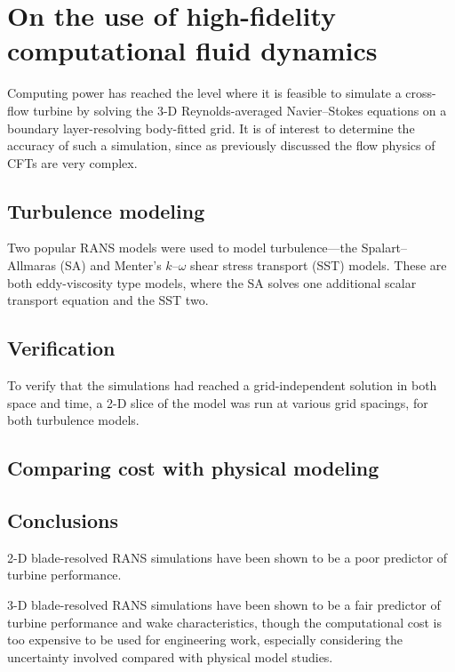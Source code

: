 \chapter{On the use of high-fidelity computational fluid dynamics}\label{chap:CFD}

Computing power has reached the level where it is feasible to simulate a
cross-flow turbine by solving the 3-D Reynolds-averaged Navier--Stokes equations
on a boundary layer-resolving body-fitted grid. It is of interest to determine
the accuracy of such a simulation, since as previously discussed the flow
physics of CFTs are very complex.


\section{Turbulence modeling}

Two popular RANS models were used to model turbulence---the Spalart--Allmaras
(SA) and Menter's $k$--$\omega$ shear stress transport (SST) models. These are
both eddy-viscosity type models, where the SA solves one additional scalar
transport equation and the SST two.


\section{Verification}

To verify that the simulations had reached a grid-independent solution in both
space and time, a 2-D slice of the model was run at various grid spacings, for
both turbulence models.


\section{Comparing cost with physical modeling}


\section{Conclusions}

2-D blade-resolved RANS simulations have been shown to be a poor predictor of
turbine performance.

3-D blade-resolved RANS simulations have been shown to be a fair predictor of
turbine performance and wake characteristics, though the computational cost is
too expensive to be used for engineering work, especially considering the
uncertainty involved compared with physical model studies.